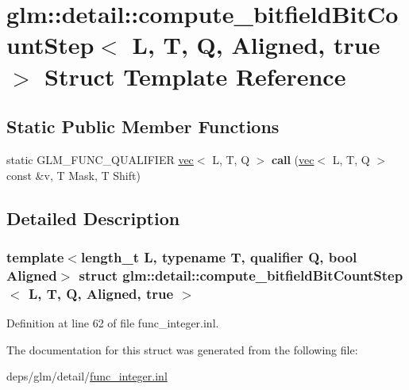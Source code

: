 \hypertarget{structglm_1_1detail_1_1compute__bitfieldBitCountStep_3_01L_00_01T_00_01Q_00_01Aligned_00_01true_01_4}{}\section{glm\+:\+:detail\+:\+:compute\+\_\+bitfield\+Bit\+Count\+Step$<$ L, T, Q, Aligned, true $>$ Struct Template Reference}
\label{structglm_1_1detail_1_1compute__bitfieldBitCountStep_3_01L_00_01T_00_01Q_00_01Aligned_00_01true_01_4}
\subsection*{Static Public Member Functions}
\begin{DoxyCompactItemize}
\item 
\mbox{\label{structglm_1_1detail_1_1compute__bitfieldBitCountStep_3_01L_00_01T_00_01Q_00_01Aligned_00_01true_01_4_a8edab4daff7f1593b8c211b5b64aff24}} 
static G\+L\+M\+\_\+\+F\+U\+N\+C\+\_\+\+Q\+U\+A\+L\+I\+F\+I\+ER \hyperlink{structglm_1_1vec}{vec}$<$ L, T, Q $>$ {\bfseries call} (\hyperlink{structglm_1_1vec}{vec}$<$ L, T, Q $>$ const \&v, T Mask, T Shift)
\end{DoxyCompactItemize}


\subsection{Detailed Description}
\subsubsection*{template$<$length\+\_\+t L, typename T, qualifier Q, bool Aligned$>$\newline
struct glm\+::detail\+::compute\+\_\+bitfield\+Bit\+Count\+Step$<$ L, T, Q, Aligned, true $>$}



Definition at line 62 of file func\+\_\+integer.\+inl.



The documentation for this struct was generated from the following file\+:\begin{DoxyCompactItemize}
\item 
deps/glm/detail/\hyperlink{func__integer_8inl}{func\+\_\+integer.\+inl}\end{DoxyCompactItemize}
